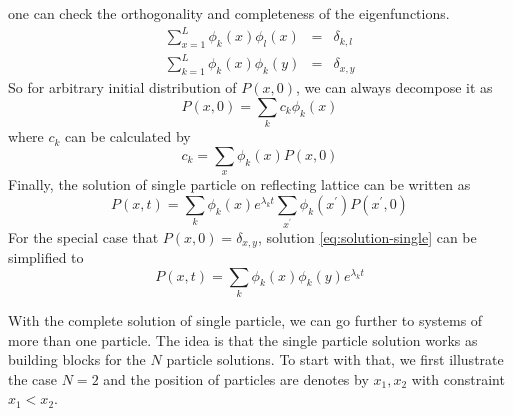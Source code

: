 \documentclass[12pt,a4paper]{article}
\begin{document}
one can check the orthogonality and completeness of the eigenfunctions.
\begin{eqnarray}
    \label{eq:orthogonality}
    \sum_{x=1}^L \phi_k(x)\phi_l(x) & = & \delta_{k,l} \\
    \label{eq:completeness}
    \sum_{k=1}^L \phi_k(x)\phi_k(y) & = & \delta_{x,y} 
\end{eqnarray}
So for arbitrary initial distribution of $P(x, 0)$, we can always decompose it as 
\begin{equation}
    \label{eq:decompose-intial-single}
    P(x,0) = \sum_k{c_k \phi_k(x)}
\end{equation}
where $c_k$ can be calculated by 
\begin{equation}
    \label{eq:coeff-k}
    c_k = \sum_x{\phi_k(x) P(x,0)}
\end{equation}
Finally, the solution of single particle on reflecting lattice can be written as
\begin{equation}
    \label{eq:solution-single}
    P(x,t) = \sum_k{\phi_k(x)e^{\lambda_k
            t}}\sum_{x^\prime}{\phi_k(x^\prime)P(x^\prime,0)}
\end{equation}
For the special case that $P(x,0) = \delta_{x,y}$, solution
\eqref{eq:solution-single} can be simplified to
\begin{equation}
    \label{eq:solution-single-simplified}
    P(x,t) = \sum_k{\phi_k(x)\phi_k(y)e^{\lambda_k t}}
\end{equation}

With the complete solution of single particle, we can go further to systems of
more than one particle. The idea is that the single particle solution works as
building blocks for the $N$ particle solutions. To start with that, we first
illustrate the case $N=2$ and the position of particles are denotes by $x_1,
x_2$ with constraint $x_1<x_2$.
\end{document}
